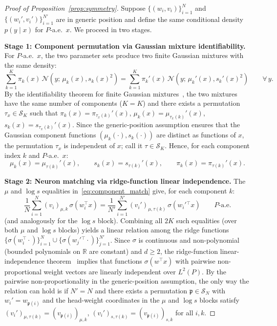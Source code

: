 \documentclass[11pt]{article}
\newcommand{\R}{\mathbb{R}}
\newcommand{\cS}{\mathcal{S}}
\newcommand{\cN}{\mathcal{N}}
\newcommand{\nperm}{\mathfrak{p}}  %
\begin{document}
\begin{proof}[Proof of Proposition~\ref{prop:symmetry}]
Suppose $\{(w_i, v_i)\}_{i=1}^N$ and $\{(w_i', v_i')\}_{i=1}^{N'}$
are in generic position and define the same conditional density
$p(y \mid x)$ for $P$-a.e.\ $x$.
We proceed in two stages.

\medskip\noindent\textbf{Stage 1: Component permutation via Gaussian
mixture identifiability.}
For $P$-a.e.\ $x$, the two parameter sets produce two finite Gaussian
mixtures with the same density:
\[
  \sum_{k=1}^K \pi_k(x)\,\cN(y;\,\mu_k(x),s_k(x)^2)
  = \sum_{k=1}^K \pi_k'(x)\,\cN(y;\,\mu_k'(x),s_k'(x)^2)
  \qquad \forall\,y.
\]
By the identifiability theorem for finite Gaussian
mixtures~\cite{yakowitz1968}, the two mixtures have the same number
of components ($K = K$) and there exists a permutation
$\tau_x \in \cS_K$ such that
$\pi_k(x) = \pi_{\tau_x(k)}'(x)$,
$\mu_k(x) = \mu_{\tau_x(k)}'(x)$,
$s_k(x) = s_{\tau_x(k)}'(x)$.
Since the generic-position assumption ensures that the Gaussian
component functions $(\mu_k(\cdot), s_k(\cdot))$ are distinct as
functions of $x$, the permutation $\tau_x$ is independent of $x$;
call it $\tau \in \cS_K$.
Hence, for each component index $k$ and $P$-a.e.\ $x$:
\begin{equation}\label{eq:component_match}
  \mu_k(x) = \mu_{\tau(k)}'(x), \qquad
  s_k(x) = s_{\tau(k)}'(x), \qquad
  \pi_k(x) = \pi_{\tau(k)}'(x).
\end{equation}

\medskip\noindent\textbf{Stage 2: Neuron matching via ridge-function
linear independence.}
The $\mu$ and $\log s$ equalities in~\eqref{eq:component_match}
give, for each component $k$:
\[
  \frac{1}{N}\sum_{i=1}^N (v_i)_{\mu,k}\,\sigma(w_i^\top x)
  = \frac{1}{N'}\sum_{i=1}^{N'} (v_i')_{\mu,\tau(k)}\,\sigma(w_i'{}^\top x)
  \qquad P\text{-a.e.}
\]
(and analogously for the $\log s$ block).
Combining all $2K$ such equalities (over both $\mu$ and $\log s$
blocks) yields a linear relation among the ridge functions
$\{\sigma(w_i^\top \cdot)\}_{i=1}^N \cup
\{\sigma(w_j'{}^\top \cdot)\}_{j=1}^{N'}$.
Since $\sigma$ is continuous and non-polynomial (bounded polynomials
on $\R$ are constant) and $d \ge 2$, the ridge-function
linear-independence theorem~\cite{pinkus1999} implies that functions
$\sigma(w^\top x)$ with pairwise non-proportional weight vectors are
linearly independent over $L^2(P)$.
By the pairwise non-proportionality in the generic-position
assumption, the only way the relation can hold is if $N' = N$ and
there exists a permutation $\nperm \in \cS_N$ with
$w_i' = w_{\nperm(i)}$
and the head-weight coordinates in the $\mu$ and $\log s$ blocks
satisfy
$(v_i')_{\mu,\tau(k)} = (v_{\nperm(i)})_{\mu,k}$,
$(v_i')_{s,\tau(k)} = (v_{\nperm(i)})_{s,k}$
for all $i, k$.


\end{proof}
\end{document}
